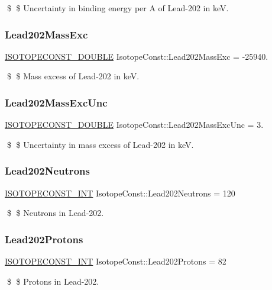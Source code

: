 \$ \$ Uncertainty in binding energy per A of Lead-\/202 in keV. \mbox{\label{group___isotope_const-_lead-_pb202_ga820c66725835eaafa3b05ce22c846eb7}} 
\subsubsection{\texorpdfstring{Lead202\+Mass\+Exc}{Lead202MassExc}}
{\footnotesize\ttfamily \mbox{\hyperlink{group___isotope_const-_macros_ga8f45a7272ce02c0b4c65c44636ed719a}{I\+S\+O\+T\+O\+P\+E\+C\+O\+N\+S\+T\+\_\+\+D\+O\+U\+B\+LE}} Isotope\+Const\+::\+Lead202\+Mass\+Exc = -\/25940.}

\$ \$ Mass excess of Lead-\/202 in keV. \mbox{\label{group___isotope_const-_lead-_pb202_ga720697c4fcc910153788957b5e28d246}} 
\subsubsection{\texorpdfstring{Lead202\+Mass\+Exc\+Unc}{Lead202MassExcUnc}}
{\footnotesize\ttfamily \mbox{\hyperlink{group___isotope_const-_macros_ga8f45a7272ce02c0b4c65c44636ed719a}{I\+S\+O\+T\+O\+P\+E\+C\+O\+N\+S\+T\+\_\+\+D\+O\+U\+B\+LE}} Isotope\+Const\+::\+Lead202\+Mass\+Exc\+Unc = 3.}

\$ \$ Uncertainty in mass excess of Lead-\/202 in keV. \mbox{\label{group___isotope_const-_lead-_pb202_gacebc3622288a506f9120694549c5212c}} 
\subsubsection{\texorpdfstring{Lead202\+Neutrons}{Lead202Neutrons}}
{\footnotesize\ttfamily \mbox{\hyperlink{group___isotope_const-_macros_ga5f18360b3e99483a35c32d789e62621c}{I\+S\+O\+T\+O\+P\+E\+C\+O\+N\+S\+T\+\_\+\+I\+NT}} Isotope\+Const\+::\+Lead202\+Neutrons = 120}

\$ \$ Neutrons in Lead-\/202. \mbox{\label{group___isotope_const-_lead-_pb202_gae3b13751db72290ad64cff9d91bccd48}} 
\subsubsection{\texorpdfstring{Lead202\+Protons}{Lead202Protons}}
{\footnotesize\ttfamily \mbox{\hyperlink{group___isotope_const-_macros_ga5f18360b3e99483a35c32d789e62621c}{I\+S\+O\+T\+O\+P\+E\+C\+O\+N\+S\+T\+\_\+\+I\+NT}} Isotope\+Const\+::\+Lead202\+Protons = 82}

\$ \$ Protons in Lead-\/202. 